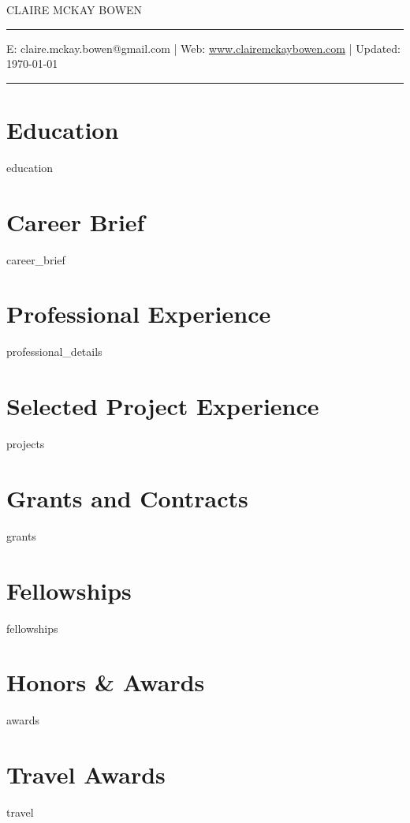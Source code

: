 \documentclass[11pt, letterpaper, roman]{moderncv} %
\begin{document}
\vspace{-10pt}
\centerline{\huge{CLAIRE MCKAY BOWEN}}
\vspace{10pt}
\hrule
\vspace{5pt}
\centerline{\small E: claire.mckay.bowen@gmail.com | Web: \href{https://www.clairemckaybowen.com}{www.clairemckaybowen.com} | Updated: \today}
\vspace{5pt}
\hrule

\section{Education}
{education}

\section{Career Brief}
{career_brief}

\section{Professional Experience}
{professional_details}

\section{Selected Project Experience}
{projects}
    
\section{Grants and Contracts}
{grants}

\section{Fellowships}
{fellowships}

\section{Honors \& Awards}
{awards}

\section{Travel Awards}
{travel}
    
\end{document}
